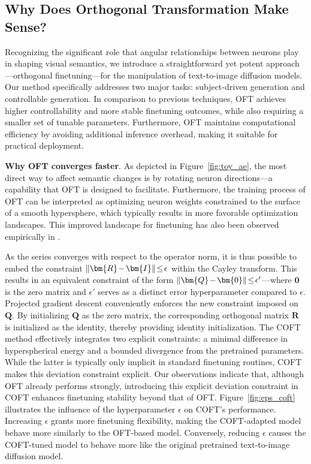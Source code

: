 \subsection{Why Does Orthogonal Transformation Make Sense?}

Recognizing the significant role that angular relationships between neurons play in shaping visual semantics, we introduce a straightforward yet potent approach—orthogonal finetuning—for the manipulation of text-to-image diffusion models. Our method specifically addresses two major tasks: subject-driven generation and controllable generation. In comparison to previous techniques, OFT achieves higher controllability and more stable finetuning outcomes, while also requiring a smaller set of tunable parameters. Furthermore, OFT maintains computational efficiency by avoiding additional inference overhead, making it suitable for practical deployment.

\textbf{Why OFT converges faster}. As depicted in Figure~\ref{fig:toy_ae}, the most direct way to affect semantic changes is by rotating neuron directions—a capability that OFT is designed to facilitate. Furthermore, the training process of OFT can be interpreted as optimizing neuron weights constrained to the surface of a smooth hypersphere, which typically results in more favorable optimization landscapes. This improved landscape for finetuning has also been observed empirically in \cite{liu2021orthogonal}.

As the series converges with respect to the operator norm, it is thus possible to embed the constraint $\thickmuskip=2mu \medmuskip=2mu\|\bm{R}-\bm{I}\|\leq\epsilon$ within the Cayley transform. This results in an equivalent constraint of the form $\thickmuskip=2mu \medmuskip=2mu \|\bm{Q}-\bm{0}\|\leq\epsilon'$—where $\bm{0}$ is the zero matrix and $\epsilon'$ serves as a distinct error hyperparameter compared to $\epsilon$. Projected gradient descent conveniently enforces the new constraint imposed on $\bm{Q}$. By initializing $\bm{Q}$ as the zero matrix, the corresponding orthogonal matrix $\bm{R}$ is initialized as the identity, thereby providing identity initialization. The COFT method effectively integrates two explicit constraints: a minimal difference in hyperspherical energy and a bounded divergence from the pretrained parameters. While the latter is typically only implicit in standard finetuning routines, COFT makes this deviation constraint explicit. Our observations indicate that, although OFT already performs strongly, introducing this explicit deviation constraint in COFT enhances finetuning stability beyond that of OFT. Figure~\ref{fig:eps_coft} illustrates the influence of the hyperparameter $\epsilon$ on COFT's performance. Increasing $\epsilon$ grants more finetuning flexibility, making the COFT-adapted model behave more similarly to the OFT-based model. Conversely, reducing $\epsilon$ causes the COFT-tuned model to behave more like the original pretrained text-to-image diffusion model.

